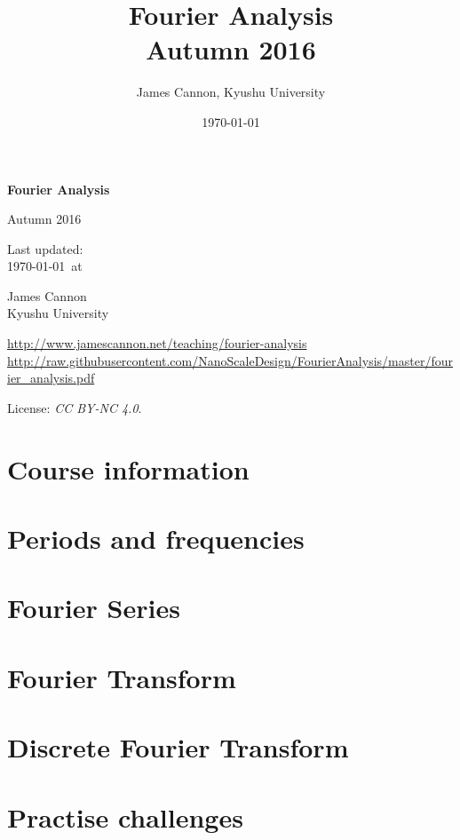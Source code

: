 \documentclass[a4paper]{book} %
\title{Fourier Analysis\\Autumn 2016}
\author{James Cannon, Kyushu University}
\date{\today}
\newcommand{\courseurl}{fourier-analysis}
\begin{document}
\begin{titlepage}
    \begin{center}
        \vspace*{1cm}

        \Huge
        \textbf{Fourier Analysis}

        Autumn 2016

        \vspace{1.5cm}
        \Large
        Last updated:\\\today \ at \currenttime

        \vspace{4.0cm}
        \LARGE
        James Cannon\\Kyushu University
         \vfill

        \normalsize
        \url{http://www.jamescannon.net/teaching/\courseurl}
        \vspace{0.2cm}
        \small
        \url{http://raw.githubusercontent.com/NanoScaleDesign/FourierAnalysis/master/fourier_analysis.pdf}
        \vspace{0.5cm}

        License: \emph{CC BY-NC 4.0}.

    \end{center}
\end{titlepage}

\setcounter{chapter}{-1}

\tableofcontents

\chapter{Course information}
\newpage





\chapter{Periods and frequencies}

\chapter{Fourier Series}

\chapter{Fourier Transform}

\chapter{Discrete Fourier Transform}

\appendix 
\chapter{Practise challenges}

\end{document}

